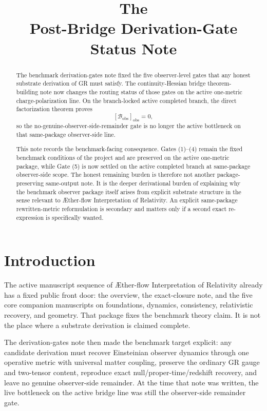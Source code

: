\documentclass[11pt]{article}
\title{\textbf{The \TheoryName{}}\\[0.4em]
\large Post-Bridge Derivation-Gate Status Note}
\author{}
\date{}
\newcommand{\Aflow}{\AE{}ther-flow}
\newcommand{\TheoryName}{\Aflow{} Interpretation of Relativity}
\newcommand{\ObsBurden}{\mathcal{B}_{\mathrm{obs}}}
\newcommand{\ObserverClass}[1]{\left[#1\right]_{\mathrm{obs}}}
\begin{document}
\maketitle

\begin{abstract}
The benchmark derivation-gates note fixed the five observer-level gates that any honest substrate derivation of GR must satisfy. The continuity-Hessian bridge theorem-building note now changes the routing status of those gates on the active one-metric charge-polarization line. On the branch-locked active completed branch, the direct factorization theorem proves
\[
\ObserverClass{\ObsBurden}=0,
\]
so the no-genuine-observer-side-remainder gate is no longer the active bottleneck on that same-package observer-side line.

This note records the benchmark-facing consequence. Gates (1)--(4) remain the fixed benchmark conditions of the project and are preserved on the active one-metric package, while Gate (5) is now settled on the active completed branch at same-package observer-side scope. The honest remaining burden is therefore not another package-preserving same-output note. It is the deeper derivational burden of explaining why the benchmark observer package itself arises from explicit substrate structure in the sense relevant to \TheoryName{}. An explicit same-package rewritten-metric reformulation is secondary and matters only if a second exact re-expression is specifically wanted.
\end{abstract}

\section{Introduction}

The active manuscript sequence of \TheoryName{} already has a fixed public front door: the overview, the exact-closure note, and the five core companion manuscripts on foundations, dynamics, consistency, relativistic recovery, and geometry. That package fixes the benchmark theory claim. It is not the place where a substrate derivation is claimed complete.

The derivation-gates note then made the benchmark target explicit: any candidate derivation must recover Einsteinian observer dynamics through one operative metric with universal matter coupling, preserve the ordinary GR gauge and two-tensor content, reproduce exact null/proper-time/redshift recovery, and leave no genuine observer-side remainder. At the time that note was written, the live bottleneck on the active bridge line was still the observer-side remainder gate.
\end{document}
